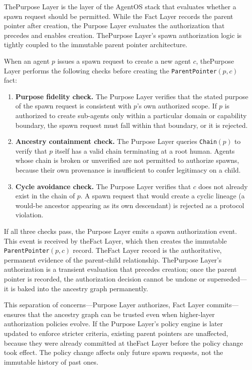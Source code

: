 ThePurpose Layer is the layer of the AgentOS stack that evaluates whether a spawn request should be permitted. While the Fact Layer records the parent pointer after creation, the Purpose Layer evaluates the authorization that precedes and enables creation. ThePurpose Layer's spawn authorization logic is tightly coupled to the immutable parent pointer architecture.

When an agent $p$ issues a spawn request to create a new agent $c$, thePurpose Layer performs the following checks before creating the \texttt{ParentPointer}$(p, c)$ fact:

\begin{enumerate}
\item \textbf{Purpose fidelity check.} The Purpose Layer verifies that the stated purpose of the spawn request is consistent with $p$'s own authorized scope. If $p$ is authorized to create sub-agents only within a particular domain or capability boundary, the spawn request must fall within that boundary, or it is rejected.
\item \textbf{Ancestry containment check.} The Purpose Layer queries \texttt{Chain}$(p)$ to verify that $p$ itself has a valid chain terminating at a root human. Agents whose chain is broken or unverified are not permitted to authorize spawns, because their own provenance is insufficient to confer legitimacy on a child.
\item \textbf{Cycle avoidance check.} The Purpose Layer verifies that $c$ does not already exist in the chain of $p$. A spawn request that would create a cyclic lineage (a would-be ancestor appearing as its own descendant) is rejected as a protocol violation.
\end{enumerate}

If all three checks pass, the Purpose Layer emits a spawn authorization event. This event is received by theFact Layer, which then creates the immutable \texttt{ParentPointer}$(p, c)$ record. TheFact Layer record is the authoritative, permanent evidence of the parent-child relationship. ThePurpose Layer's authorization is a transient evaluation that precedes creation; once the parent pointer is recorded, the authorization decision cannot be undone or superseded—it is baked into the ancestry graph permanently.

This separation of concerns—Purpose Layer authorizes, Fact Layer commits—ensures that the ancestry graph can be trusted even when higher-layer authorization policies evolve. If the Purpose Layer's policy engine is later updated to enforce stricter criteria, existing parent pointers are unaffected, because they were already committed at theFact Layer before the policy change took effect. The policy change affects only future spawn requests, not the immutable history of past ones.

